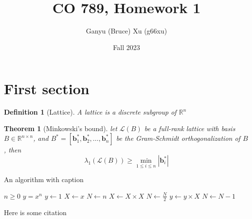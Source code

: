 \documentclass{article}
\title{CO 789, Homework 1}
\author{Ganyu (Bruce) Xu (g66xu)}
\date{Fall 2023}
\newcommand{\norm}[1]{\left\lvert {#1} \right\rvert}
\newtheorem{definition}{Definition}[section]
\newtheorem{theorem}{Theorem}[section]
\begin{document}
\maketitle

\section{First section}
\begin{definition}[Lattice]\label{lattice-def}
A lattice is a discrete subgroup of $\mathbb{R}^n$
\end{definition}

\begin{theorem}[Minkowski's bound]
    let $\mathcal{L}(B)$ be a full-rank lattice with basis $B \in \mathbb{R}^{n \times n}$, and $B^\ast = [\mathbf{b}_1^\ast, \mathbf{b}_2^\ast, \ldots, \mathbf{b}_n^\ast]$ be the Gram-Schmidt orthogonalization of $B$, then
    \begin{equation}
        \lambda_1(\mathcal{L}(B)) \geq \min_{1 \leq i \leq n}\norm{\mathbf{b}_i^\ast}
    \end{equation}
\end{theorem}

\begin{algorithm}
    \caption{An algorithm with caption}\label{alg:cap}
    \begin{algorithmic}
        \Require $n \geq 0$
        \Ensure $y = x^n$
        \State $y \gets 1$
        \State $X \gets x$
        \State $N \gets n$
                \State $X \gets X \times X$
                \State $N \gets \frac{N}{2}$  
                \State $y \gets y \times X$
                \State $N \gets N - 1$
            \EndIf
        \EndWhile
    \end{algorithmic}
\end{algorithm}

Here is some citation\cite{fujisaki1999secure}



\end{document}
